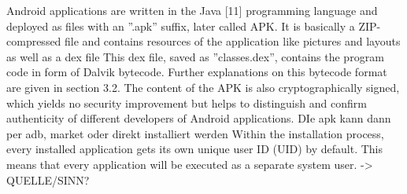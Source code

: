 Android applications are written in the Java [11] programming language and deployed as files with an ”.apk” suffix, later called APK. It is basically a ZIP-compressed file and contains resources of the application like pictures and layouts as well as a dex file\newline
This dex file, saved as ”classes.dex”, contains the program code in form of Dalvik bytecode. Further explanations on this bytecode format are given in section 3.2. The content of the APK is also cryptographically signed, which yields no security improvement but helps to distinguish and confirm authenticity of different developers of Android applications.\newline
DIe apk kann dann per adb, market oder direkt installiert werden\newline
Within the installation process, every installed application gets its own unique user ID (UID) by default. This means that every application will be executed as a separate system user. -> QUELLE/SINN?\newline
